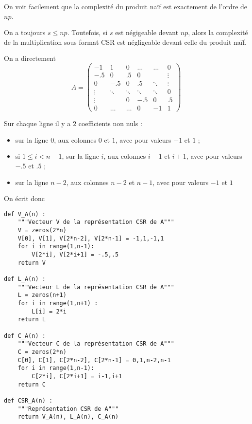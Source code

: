 \question{} 
On voit facilement que la complexité du produit naïf est exactement de l'ordre de $np$. 

On a toujours $s \leq np$. Toutefois, si $s$ est négigeable devant $np$, alors la complexité de la multiplication sous format CSR est négligeable devant celle du produit naïf. 

\question{}
On a directement 
\begin{equation*}
    A = \begin{pmatrix}
            -1     & 1      & 0      & \dots  & \dots  & 0\\
            -.5    & 0      & .5     & 0      &        & \vdots \\
            0      & -.5    &   0    & .5     & \ddots & \vdots \\
            \vdots & \ddots & \ddots & \ddots & \ddots & 0 \\
            \vdots &        & 0      & -.5    & 0      & .5 \\
            0      & \dots  & \dots  & 0      & -1     & 1    
        \end{pmatrix}
\end{equation*}

\question{}
Sur chaque ligne il y a $2$ coefficients non nuls : 
\begin{itemize}
    \item sur la ligne \no$0$, aux colonnes $0$ et $1$, avec pour valeurs $-1$ et $1$ ; 
    \item si $1 \leq i < n-1$, sur la ligne \no$i$, aux colonnes $i-1$ et $i+1$, avec pour valeurs $-.5$ et $.5$ ; 
    \item sur la ligne \no$n-2$, aux colonnes $n-2$ et $n-1$, avec pour valeurs $-1$ et $1$
\end{itemize}
On écrit donc 
\begin{verbatim}
def V_A(n) :
    """Vecteur V de la représentation CSR de A"""
    V = zeros(2*n)
    V[0], V[1], V[2*n-2], V[2*n-1] = -1,1,-1,1
    for i in range(1,n-1):
        V[2*i], V[2*i+1] = -.5,.5
    return V

def L_A(n) :
    """Vecteur L de la représentation CSR de A"""
    L = zeros(n+1)
    for i in range(1,n+1) :
        L[i] = 2*i
    return L

def C_A(n) :
    """Vecteur C de la représentation CSR de A"""
    C = zeros(2*n)
    C[0], C[1], C[2*n-2], C[2*n-1] = 0,1,n-2,n-1
    for i in range(1,n-1):
        C[2*i], C[2*i+1] = i-1,i+1
    return C

def CSR_A(n) :
    """Représentation CSR de A"""
    return V_A(n), L_A(n), C_A(n)
\end{verbatim}
